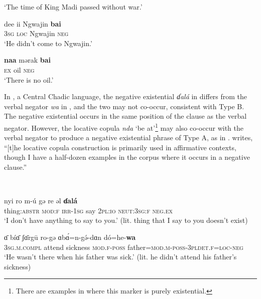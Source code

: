 \documentclass[output=paper,draft,draftmode,colorlinks,citecolor=brown]{langscibook}
\begin{document}
\glt `The time of King Madi passed without war.'%
%
\footnotemark{} 
%
\ex\label{ex:ngizim-Ngwajin} 

\gll dee ii Ngwajin \textbf{bai}\\ 3\textsc{sg} \textsc{loc} Ngwajin \textsc{neg}\\

\glt `He didn't come to Ngwajin.'
\ex\label{ex:ngizim-oil}

\gll \textbf{naa} mərak \textbf{bai}\\
\textsc{ex} oil \textsc{neg}\\

\glt `There is no oil.'

\z
\z

In , a Central Chadic language, the negative existential \textit{ɗalá} in  differs from the verbal negator \textit{wa} in , and the two may not co-occur, consistent with Type B. The negative existential occurs in the same position of the clause as the verbal negator. However, the locative copula \textit{nda} `be at'\footnote{There are examples in \citet{Allison2020} where this marker is purely existential.} may also co-occur with the verbal negator to produce a negative existential phrase of Type A, as in . \citet[347]{Allison2020} writes, ``[t]he locative copula construction is primarily used in affirmative contexts, though I have a half-dozen examples in the corpus where it occurs in a negative clause.''

\ea\label{ex:makarykotoko-say-sick-trust}
\\

\ea\label{ex:makarykotoko-say}

\gll nyi ro m-\'u gə re əl \textbf{ɗalá}\\
thing:\textsc{abstr} \textsc{mod:f} \textsc{irr-1sg} say 2\textsc{pl:io} \textsc{neut:3sg:f} \textsc{neg.ex}\\

\glt `I don't have anything to say to you.' (lit. thing that I say to you doesn't exist)
\ex\label{ex:makarykotoko-sick}

\gll  ɑ̄ bíɑ̄ ʃɑ̄rgū ro-gə ɑbɑ́=n-gə́-dɑn dó=he-\textbf{wa} \\
\textsc{3sg.m.compl} attend sickness \textsc{mod.f-poss} father=\textsc{mod.m-poss-3pl}\textsc{det.f=loc-neg}\\
\glt `He wasn't there when his father was sick.' (lit. he didn't attend his father's sickness)
\ex\label{ex:makarykotoko-trust}
\end{document}

